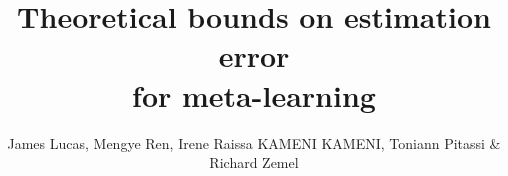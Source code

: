 \documentclass{article} %
\title{Theoretical bounds on estimation error\\for meta-learning}
\author{James Lucas, Mengye Ren, Irene Raissa KAMENI KAMENI, Toniann Pitassi \& Richard Zemel}
\begin{document}
\maketitle




% 
% 












\clearpage
\appendix
\onecolumn

\end{document}
